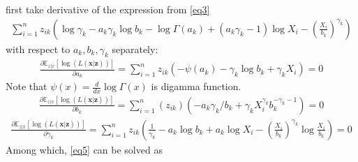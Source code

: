 \documentclass[
  letterpaper,
  DIV=11,
  numbers=noendperiod,
  oneside]{scrreprt}
\begin{document}
first take derivative of the expression from \eqref{eq3} \begin{align*}
    \sum^{n}_{i=1} z_{ik}\left( \log{\gamma_k}-a_k{\gamma_k} \log b_k-\log\Gamma(a_k)+(a_k{\gamma_k}-1)\log X_i-\left(\frac{X_i}{b_k}\right)^{\gamma_k} \right)
\end{align*} with respect to \(a_k, b_k, {\gamma_k}\) separately:\\
\begin{align}\label{eq4} 
      \frac{\partial \mathbb E_{z|x}[\log(L(\mathbf{x}|\mathbf{z}))]}{\partial a_k}
      =\sum^{n}_{i=1} z_{ik}(-\psi(a_k)-{\gamma_k} \log b_k+{\gamma_k} X_i)=0
  \end{align} Note that
\(\psi(x)=\displaystyle\frac{d }{dx}\log\Gamma(x)\) is digamma function.
\begin{align}\label{eq5} 
    \frac{\partial \mathbb E_{z|x}[\log(L(\mathbf{x}|\mathbf{z}))]}{\partial b_k}
    =\sum^{n}_{i=1}(z_{ik})(-a_k{\gamma_k}/b_k+{\gamma_k} X_i^{{\gamma_k}} b_k^{-{\gamma_k}-1})=0
\end{align} \begin{align}\label{eq6} 
    \frac{\partial \mathbb E_{z|x}[\log(L(\mathbf{x}|\mathbf{z}))]}{\partial {\gamma_k}}
    =\sum^{n}_{i=1}z_{ik}\left(\frac{1}{\gamma_k}-a_k\log b_k+a_k\log X_i-\left(\frac{X_i}{b_k}\right)^{\gamma_k} \log\frac{X_i}{b_k}\right)=0
\end{align} Among which, \eqref{eq5} can be solved as
\end{document}
